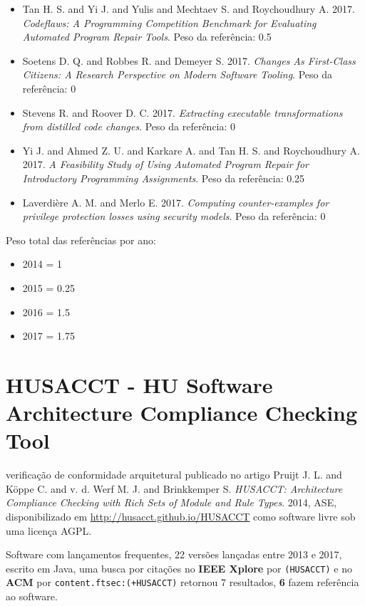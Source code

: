 \begin{itemize}
\item Tan H. S. and Yi J. and Yulis and Mechtaev S. and Roychoudhury A.
      2017.
      {\it Codeflaws: A Programming Competition Benchmark for Evaluating Automated Program Repair Tools}.
      Peso da referência: 0.5
\item Soetens D. Q. and Robbes R. and Demeyer S.
      2017.
      {\it Changes As First-Class Citizens: A Research Perspective on Modern Software Tooling}.
      Peso da referência: 0
\item Stevens R. and Roover D. C.
      2017.
      {\it Extracting executable transformations from distilled code changes}.
      Peso da referência: 0
\item Yi J. and Ahmed Z. U. and Karkare A. and Tan H. S. and Roychoudhury A.
      2017.
      {\it A Feasibility Study of Using Automated Program Repair for Introductory Programming Assignments}.
      Peso da referência: 0.25
\item Laverdière A. M. and Merlo E.
      2017.
      {\it Computing counter-examples for privilege protection losses using security models}.
      Peso da referência: 0
\end{itemize}

Peso total das referências por ano:

\begin{itemize}
\item 2014 = 1
\item 2015 = 0.25
\item 2016 = 1.5
\item 2017 = 1.75
\end{itemize}


\section{HUSACCT - HU Software Architecture Compliance Checking Tool}

verificação de conformidade arquitetural
publicado no artigo
Pruijt J. L. and K\"{o}ppe C. and v. d. Werf M. J. and Brinkkemper S.
{\it HUSACCT: Architecture Compliance Checking with Rich Sets of Module and Rule Types}.
2014,
ASE,
disponibilizado em \url{http://husacct.github.io/HUSACCT}
como software livre
sob uma licença AGPL.

Software com lançamentos frequentes,
22 versões lançadas
entre 2013 e 2017,
escrito em Java,
uma busca por citações no {\bf IEEE Xplore} por
\texttt{(HUSACCT)}
e no {\bf ACM} por
\texttt{content.ftsec:(+HUSACCT)}
retornou
7 resultados,
{\bf 6} fazem referência ao software.

